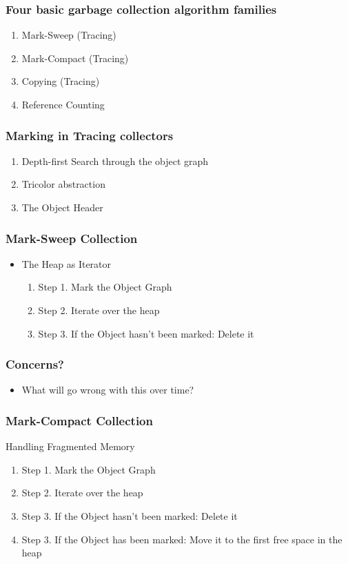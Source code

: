\documentclass{beamer}
\begin{document}
\begin{frame}
  \frametitle{Four basic garbage collection algorithm families}
  \begin{enumerate}
    \item Mark-Sweep (Tracing)
    \item Mark-Compact (Tracing)
    \item Copying (Tracing)
    \item Reference Counting
  \end{enumerate}
\end{frame}

\begin{frame}
  \frametitle{Marking in Tracing collectors}
  \begin{enumerate}
    \item Depth-first Search through the object graph
    \item Tricolor abstraction
    \item The Object Header
  \end{enumerate}
\end{frame}

\begin{frame}
  \frametitle{Mark-Sweep Collection}
  \begin{itemize}
    \item The Heap as Iterator
    \begin{enumerate}
      \item Step 1. Mark the Object Graph
      \item Step 2. Iterate over the heap
      \item Step 3. If the Object hasn't been marked: Delete it
    \end{enumerate}
  \end{itemize}
\end{frame}

\begin{frame}
  \frametitle{Concerns?}
  \begin{itemize}
    \item What will go wrong with this over time?
  \end{itemize}
\end{frame}

\begin{frame}
  \frametitle{Mark-Compact Collection}
  \item Handling Fragmented Memory
  \begin{enumerate}
    \item Step 1. Mark the Object Graph
    \item Step 2. Iterate over the heap
    \item Step 3. If the Object hasn't been marked: Delete it
    \item Step 3. If the Object has    been marked: Move it to the first free space in the heap
  \end{enumerate}
\end{frame}
\end{document}
